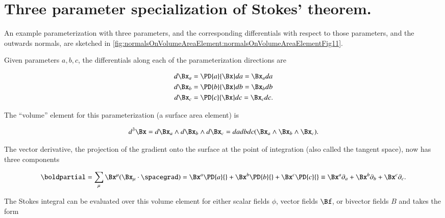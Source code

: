 \section{Three parameter specialization of Stokes' theorem.}

An example parameterization with three parameters, and the corresponding differentials with respect to those parameters, and the outwards normals, are sketched in
\cref{fig:normalsOnVolumeAreaElement:normalsOnVolumeAreaElementFig11}.


Given parameters \( a, b, c \), the differentials along each of the parameterization directions are

\begin{dmath}\label{eqn:stokesTheoremCore:1421}
\begin{aligned}
d\Bx_a &= \PD{a}{\Bx} da = \Bx_a da \\
d\Bx_b &= \PD{b}{\Bx} db = \Bx_b db \\
d\Bx_c &= \PD{c}{\Bx} dc = \Bx_c dc.
\end{aligned}
\end{dmath}

The ``volume'' element for this parameterization (a surface area element) is

\begin{equation}\label{eqn:stokesTheoremCore:1441}
d^3 \Bx
=
d\Bx_a
\wedge
d\Bx_b
\wedge
d\Bx_c
=
da db dc (\Bx_a \wedge \Bx_b \wedge \Bx_c).
\end{equation}

The vector derivative, the projection of the gradient onto the surface at the point of integration (also called the tangent space), now has three components

\begin{dmath}\label{eqn:stokesTheoremCore:1461}
\boldpartial
=
\sum_\mu \Bx^\mu (\Bx_\mu \cdot \spacegrad)
=
\Bx^a \PD{a}{}
+
\Bx^b \PD{b}{}
+
\Bx^c \PD{c}{}
\equiv
\Bx^a \partial_a
+
\Bx^b \partial_b
+
\Bx^c \partial_c.
\end{dmath}

The Stokes integral can be evaluated over this volume element for either scalar fields \( \phi \), vector fields \( \Bf \), or bivector fields \( B \) and takes the form


